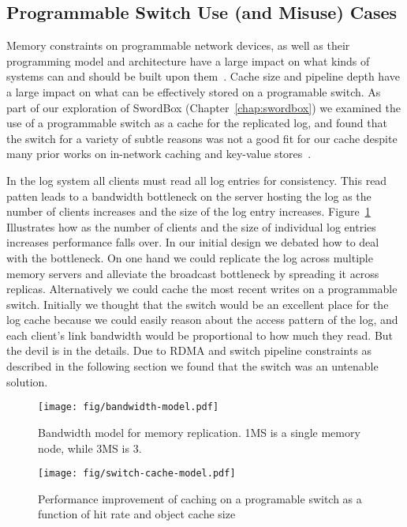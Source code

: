 \documentclass[12pt]{ucsddissertation}
\newcommand{\sword}{SwordBox}
\begin{document}
\subsection{Programmable Switch Use (and Misuse) Cases}

Memory constraints on programmable network devices, as well as their programming model and
architecture have a large impact on what kinds of systems can and should be built upon
them~\cite{when-computer}. Cache size and pipeline depth have a large impact on what can be
effectively stored on a programable switch. As part of our exploration of {\sword}
(Chapter~\ref{chap:swordbox}) we examined the use of a programmable switch as a cache for the
replicated log, and found that the switch for a variety of subtle reasons was not a good fit for our
cache despite many prior works on in-network caching and key-value
stores~\cite{netcache,netchain,netkv,netlock}.

In the log system all clients must read all log entries for consistency. This read patten leads to a
bandwidth bottleneck on the server hosting the log as the number of clients increases and the size
of the log entry increases.  Figure~\ref{fig:bandwidth-model} Illustrates how as the number of
clients and the size of individual log entries increases performance falls over. In our initial
design we debated how to deal with the bottleneck. On one hand we could replicate the log across
multiple memory servers and alleviate the broadcast bottleneck by spreading it across replicas.
Alternatively we could cache the most recent writes on a programmable switch.  Initially we thought
that the switch would be an excellent place for the log cache because we could easily reason about
the access pattern of the log, and each client's link bandwidth would be proportional to how much
they read. But the devil is in the details. Due to RDMA and switch pipeline constraints as described
in the following section we found that the switch was an untenable solution.

\begin{figure}
\centering
\texttt{[image: fig/bandwidth-model.pdf]}
\caption{Bandwidth model for memory replication. 1MS is a single memory node, while 3MS is 3.}
\label{fig:bandwidth-model}
\end{figure}

\begin{figure}
    \centering
    \texttt{[image: fig/switch-cache-model.pdf]}
    \caption{Performance improvement of caching on a programable switch as a function of hit rate and object cache size}
    \label{fig:switch-cache-model}
\end{figure}
\end{document}
